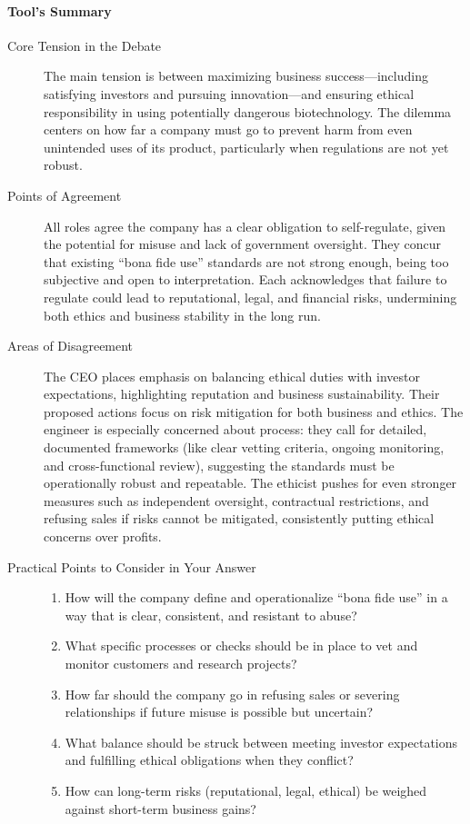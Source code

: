 \paragraph{Tool's Summary}{
  \begin{description}
    \item[Core Tension in the Debate] The main tension is between maximizing business success—including satisfying investors and pursuing innovation—and ensuring ethical responsibility in using potentially dangerous biotechnology. The dilemma centers on how far a company must go to prevent harm from even unintended uses of its product, particularly when regulations are not yet robust.
    \item[Points of Agreement] All roles agree the company has a clear obligation to self-regulate, given the potential for misuse and lack of government oversight.
      They concur that existing “bona fide use” standards are not strong enough, being too subjective and open to interpretation.
      Each acknowledges that failure to regulate could lead to reputational, legal, and financial risks, undermining both ethics and business stability in the long run.
    \item[Areas of Disagreement] The CEO places emphasis on balancing ethical duties with investor expectations, highlighting reputation and business sustainability. Their proposed actions focus on risk mitigation for both business and ethics.
      The engineer is especially concerned about process: they call for detailed, documented frameworks (like clear vetting criteria, ongoing monitoring, and cross-functional review), suggesting the standards must be operationally robust and repeatable. The ethicist pushes for even stronger measures such as independent oversight, contractual restrictions, and refusing sales if risks cannot be mitigated, consistently putting ethical concerns over profits.
    \item[Practical Points to Consider in Your Answer]{
        \hfill
        \begin{enumerate}[label=(\alph*)]
          \item How will the company define and operationalize “bona fide use” in a way that is clear, consistent, and resistant to abuse?
          \item What specific processes or checks should be in place to vet and monitor customers and research projects?
          \item How far should the company go in refusing sales or severing relationships if future misuse is possible but uncertain?
          \item What balance should be struck between meeting investor expectations and fulfilling ethical obligations when they conflict?
          \item How can long-term risks (reputational, legal, ethical) be weighed against short-term business gains?
        \end{enumerate}
      }
  \end{description}
}

